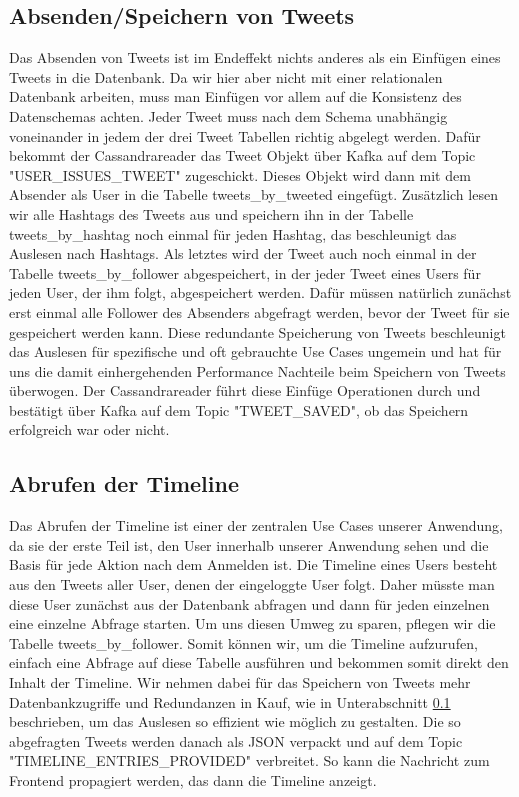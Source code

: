 \subsection{Absenden/Speichern von Tweets}
\label{subsec:Tweetabfrage}
Das Absenden von Tweets ist im Endeffekt nichts anderes als ein Einfügen eines Tweets in die Datenbank. Da wir hier aber nicht mit einer relationalen Datenbank arbeiten, muss man Einfügen vor allem auf die Konsistenz des Datenschemas achten. Jeder Tweet muss nach dem Schema unabhängig voneinander in jedem der drei Tweet Tabellen richtig abgelegt werden. Dafür bekommt der Cassandrareader das Tweet Objekt über Kafka auf dem Topic "USER\_ISSUES\_TWEET" zugeschickt. Dieses Objekt wird dann mit dem Absender als User in die Tabelle tweets\_by\_tweeted eingefügt. Zusätzlich lesen wir alle Hashtags des Tweets aus und speichern ihn in der Tabelle tweets\_by\_hashtag noch einmal für jeden Hashtag, das beschleunigt das Auslesen nach Hashtags. Als letztes wird der Tweet auch noch einmal in der Tabelle tweets\_by\_follower abgespeichert, in der jeder Tweet eines Users für jeden User, der ihm folgt, abgespeichert werden. Dafür müssen natürlich zunächst erst einmal alle Follower des Absenders abgefragt werden, bevor der Tweet für sie gespeichert werden kann. Diese redundante Speicherung von Tweets beschleunigt das Auslesen für spezifische und oft gebrauchte Use Cases ungemein und hat für uns die damit einhergehenden Performance Nachteile beim Speichern von Tweets überwogen. Der Cassandrareader führt diese Einfüge Operationen durch und bestätigt über Kafka auf dem Topic "TWEET\_SAVED", ob das Speichern erfolgreich war oder nicht.


\subsection{Abrufen der Timeline}
\label{subsec:Timeline}
Das Abrufen der Timeline ist einer der zentralen Use Cases unserer Anwendung, da sie der erste Teil ist, den User innerhalb unserer Anwendung sehen und die Basis für jede Aktion nach dem Anmelden ist. Die Timeline eines Users besteht aus den Tweets aller User, denen der eingeloggte User folgt. Daher müsste man diese User zunächst aus der Datenbank abfragen und dann für jeden einzelnen eine einzelne Abfrage starten. Um uns diesen Umweg zu sparen, pflegen wir die Tabelle tweets\_by\_follower. Somit können wir, um die Timeline aufzurufen, einfach eine Abfrage auf diese Tabelle ausführen und bekommen somit direkt den Inhalt der Timeline. Wir nehmen dabei für das Speichern von Tweets mehr Datenbankzugriffe und Redundanzen in Kauf, wie in Unterabschnitt \ref{subsec:Tweetabfrage} beschrieben, um das Auslesen so effizient wie möglich zu gestalten. Die so abgefragten Tweets werden danach als JSON verpackt und auf dem Topic "TIMELINE\_ENTRIES\_PROVIDED" verbreitet. So kann die Nachricht zum Frontend propagiert werden, das dann die Timeline anzeigt.


